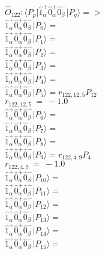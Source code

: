 \documentclass[14pt]{article}
\begin{document}
    $\hat{O}_{122}:  \langle{P_p}\vert \hat{1}_{\alpha}^{+}\hat{0}_{\alpha}^{+}\hat{0}_{\beta}^{-} \vert{P_q}\rangle => $ \\ 
    $ \hat{1}_{\alpha}^{+}\hat{0}_{\alpha}^{+}\hat{0}_{\beta}^{-} \vert{P_{0}}\rangle =  $ \\ 
    $ \hat{1}_{\alpha}^{+}\hat{0}_{\alpha}^{+}\hat{0}_{\beta}^{-} \vert{P_{1}}\rangle =  $ \\ 
    $ \hat{1}_{\alpha}^{+}\hat{0}_{\alpha}^{+}\hat{0}_{\beta}^{-} \vert{P_{2}}\rangle =  $ \\ 
    $ \hat{1}_{\alpha}^{+}\hat{0}_{\alpha}^{+}\hat{0}_{\beta}^{-} \vert{P_{3}}\rangle =  $ \\ 
    $ \hat{1}_{\alpha}^{+}\hat{0}_{\alpha}^{+}\hat{0}_{\beta}^{-} \vert{P_{4}}\rangle =  $ \\ 
    $ \hat{1}_{\alpha}^{+}\hat{0}_{\alpha}^{+}\hat{0}_{\beta}^{-} \vert{P_{5}}\rangle = {r}_{122,12,5}P_{12} $ \\ 
    ${r}_{122,12,5}\ =\ -1.0 $ \\ 
    $ \hat{1}_{\alpha}^{+}\hat{0}_{\alpha}^{+}\hat{0}_{\beta}^{-} \vert{P_{6}}\rangle =  $ \\ 
    $ \hat{1}_{\alpha}^{+}\hat{0}_{\alpha}^{+}\hat{0}_{\beta}^{-} \vert{P_{7}}\rangle =  $ \\ 
    $ \hat{1}_{\alpha}^{+}\hat{0}_{\alpha}^{+}\hat{0}_{\beta}^{-} \vert{P_{8}}\rangle =  $ \\ 
    $ \hat{1}_{\alpha}^{+}\hat{0}_{\alpha}^{+}\hat{0}_{\beta}^{-} \vert{P_{9}}\rangle = {r}_{122,4,9}P_{4} $ \\ 
    ${r}_{122,4,9}\ =\ -1.0 $ \\ 
    $ \hat{1}_{\alpha}^{+}\hat{0}_{\alpha}^{+}\hat{0}_{\beta}^{-} \vert{P_{10}}\rangle =  $ \\ 
    $ \hat{1}_{\alpha}^{+}\hat{0}_{\alpha}^{+}\hat{0}_{\beta}^{-} \vert{P_{11}}\rangle =  $ \\ 
    $ \hat{1}_{\alpha}^{+}\hat{0}_{\alpha}^{+}\hat{0}_{\beta}^{-} \vert{P_{12}}\rangle =  $ \\ 
    $ \hat{1}_{\alpha}^{+}\hat{0}_{\alpha}^{+}\hat{0}_{\beta}^{-} \vert{P_{13}}\rangle =  $ \\ 
    $ \hat{1}_{\alpha}^{+}\hat{0}_{\alpha}^{+}\hat{0}_{\beta}^{-} \vert{P_{14}}\rangle =  $ \\ 
    $ \hat{1}_{\alpha}^{+}\hat{0}_{\alpha}^{+}\hat{0}_{\beta}^{-} \vert{P_{15}}\rangle =  $ \\ 
    
\end{document}
